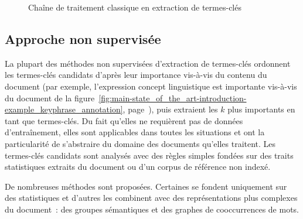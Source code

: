 \begin{figure}[t]
      \caption{Chaîne de traitement classique en extraction de termes-clés
               \label{fig:etapes_de_l_extraction_de_termes_cles}}
    \end{figure}

    \subsection{Approche non supervisée}
    \label{subsec:main-state_of_the_art-automatic_keyphrase_extraction-unsupervised_keyphrase_extraction}
      La plupart des méthodes non supervisées d'extraction de termes-clés
      ordonnent les termes-clés candidats d'après leur importance vis-à-vis du
      contenu du document (par exemple, l'expression \og{}concept
      linguistique\fg{} est importante vis-à-vis du document de la
      figure~\ref{fig:main-state_of_the_art-introduction-example_keyphrase_annotation},
      page~\pageref{fig:main-state_of_the_art-introduction-example_keyphrase_annotation}),
      puis extraient les $k$ plus importants en tant que termes-clés. Du fait
      qu'elles ne requièrent pas de données d'entraînement, elles sont
      applicables dans toutes les situations et ont la
      particularité de s'abstraire du domaine des documents
      qu'elles traitent. Les termes-clés candidats sont analysés avec des règles
      simples fondées sur des traits statistiques extraits du document ou d'un
      corpus de référence non indexé.

      De nombreuses méthodes sont proposées. Certaines se fondent uniquement
      sur des statistiques et d'autres les combinent avec des représentations
      plus complexes du document~: des groupes sémantiques et des
      graphes de cooccurrences de mots.

